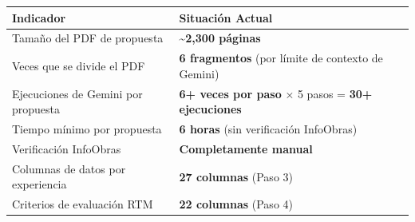 \documentclass[11pt,a4paper]{article}
\begin{document}
\begin{center}
\begin{tabular}{|>{\raggedright\arraybackslash}m{5.5cm}|>{\centering\arraybackslash}m{7cm}|}
\hline
\textbf{Indicador} & \textbf{Situación Actual} \\
\hline
Tamaño del PDF de propuesta & \textbf{\textasciitilde2,300 páginas} \\
\hline
Veces que se divide el PDF & \textbf{6 fragmentos} (por límite de contexto de Gemini) \\
\hline
Ejecuciones de Gemini por propuesta & \textbf{6+ veces por paso} × 5 pasos = \textbf{30+ ejecuciones} \\
\hline
Tiempo mínimo por propuesta & \textbf{6 horas} (sin verificación InfoObras) \\
\hline
Verificación InfoObras & \textbf{Completamente manual} \\
\hline
Columnas de datos por experiencia & \textbf{27 columnas} (Paso 3) \\
\hline
Criterios de evaluación RTM & \textbf{22 columnas} (Paso 4) \\
\hline
\end{tabular}
\end{center}
\end{document}
